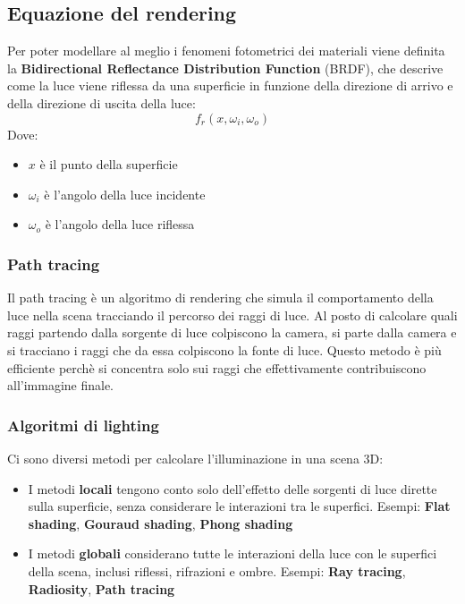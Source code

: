\documentclass[a4paper]{article}
\begin{document}
\subsection{Equazione del rendering}
Per poter modellare al meglio i fenomeni fotometrici dei materiali viene definita la 
\textbf{Bidirectional Reflectance Distribution Function} (BRDF), che descrive come la luce
viene riflessa da una superficie in funzione della direzione di arrivo e della direzione
di uscita della luce:
\[
  f_r(x, \omega_i, \omega_o)
\] 
Dove:
\begin{itemize}
  \item \( x \) è il punto della superficie
  \item \( \omega_i \) è l'angolo della luce incidente
  \item \( \omega_o \) è l'angolo della luce riflessa
\end{itemize}

\subsubsection{Path tracing}
Il path tracing è un algoritmo di rendering che simula il comportamento della luce
nella scena tracciando il percorso dei raggi di luce. Al posto di calcolare quali raggi
partendo dalla sorgente di luce colpiscono la camera, si parte dalla camera e si
tracciano i raggi che da essa colpiscono la fonte di luce. Questo metodo è più efficiente
perchè si concentra solo sui raggi che effettivamente contribuiscono all'immagine finale.

\subsubsection{Algoritmi di lighting}
Ci sono diversi metodi per calcolare l'illuminazione in una scena 3D:
\begin{itemize}
  \item I metodi \textbf{locali} tengono conto solo dell'effetto delle sorgenti di luce
    dirette sulla superficie, senza considerare le interazioni tra le superfici.
    Esempi: \textbf{Flat shading}, \textbf{Gouraud shading}, \textbf{Phong shading}
  \item I metodi \textbf{globali} considerano tutte le interazioni della luce con le
    superfici della scena, inclusi riflessi, rifrazioni e ombre. Esempi: \textbf{Ray tracing},
    \textbf{Radiosity}, \textbf{Path tracing}
\end{itemize}
\end{document}
